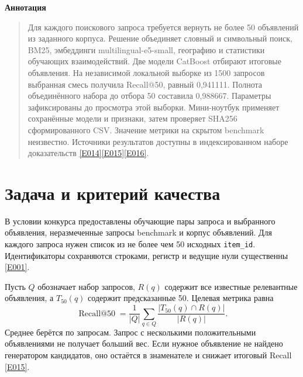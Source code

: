 \documentclass{article}
\renewenvironment{abstract}{\centerline{\large\bfseries Аннотация}\vspace{-0.12in}\begin{quote}}{\par\end{quote}\vskip 0.12in}
\newcommand{\ev}[1]{\href{https://github.com/revefffect/avito-contest/blob/main/evidence/INDEX.md\#E#1}{[E#1]}}
\newcommand{\file}[1]{\texttt{\small #1}}
\begin{document}
\raggedbottom
{}
\begingroup
\renewcommand\thefootnote{}
\endgroup

\begin{abstract}
Для каждого поискового запроса требуется вернуть не более 50 объявлений из заданного корпуса. Решение объединяет словный и символьный поиск, BM25, эмбеддинги multilingual-e5-small, географию и статистики обучающих взаимодействий. Две модели CatBoost отбирают итоговые объявления. На независимой локальной выборке из 1500 запросов выбранная смесь получила Recall@50, равный 0{,}941111. Полнота объединённого набора до отбора 50 составила 0{,}988667. Параметры зафиксированы до просмотра этой выборки. Мини-ноутбук применяет сохранённые модели и признаки, затем проверяет SHA256 сформированного CSV. Значение метрики на скрытом benchmark неизвестно. Источники результатов доступны в индексированном наборе доказательств \ev{014}\ev{015}\ev{016}.
\end{abstract}

\section{Задача и критерий качества}

В условии конкурса предоставлены обучающие пары запроса и выбранного объявления, неразмеченные запросы benchmark и корпус объявлений. Для каждого запроса нужен список из не более чем 50 исходных \file{item\_id}. Идентификаторы сохраняются строками, регистр и ведущие нули существенны \ev{001}.

Пусть $Q$ обозначает набор запросов, $R(q)$ содержит все известные релевантные объявления, а $T_{50}(q)$ содержит предсказанные 50. Целевая метрика равна
\begin{equation}
\operatorname{Recall@50}=\frac{1}{|Q|}\sum_{q\in Q}
\frac{|T_{50}(q)\cap R(q)|}{|R(q)|}.
\label{eq:recall}
\end{equation}
Среднее берётся по запросам. Запрос с несколькими положительными объявлениями не получает больший вес. Если нужное объявление не найдено генератором кандидатов, оно остаётся в знаменателе и снижает итоговый Recall \ev{015}.
\end{document}
